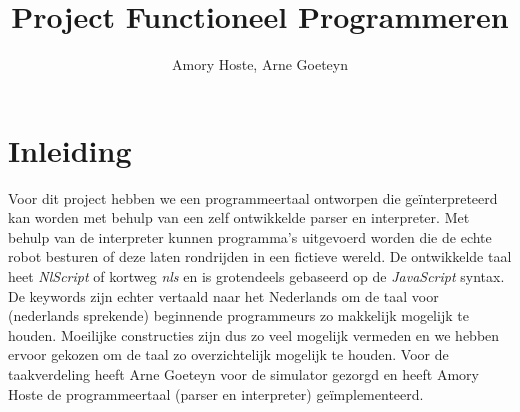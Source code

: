 \documentclass[12pt, titlepage]{article}
\begin{document}
\title{Project Functioneel Programmeren}
\author{Amory Hoste, Arne Goeteyn}
\date{}
\maketitle

\tableofcontents

\newpage
\section{Inleiding}
\label{sec:inleiding}
Voor dit project hebben we een programmeertaal ontworpen die geïnterpreteerd kan worden met behulp van een zelf ontwikkelde parser en interpreter. Met behulp van de interpreter kunnen programma's uitgevoerd worden die de echte robot besturen of deze laten rondrijden in een fictieve wereld. De ontwikkelde taal heet \emph{NlScript} of kortweg \emph{nls} en is grotendeels gebaseerd op de \emph{JavaScript} syntax. De keywords zijn echter vertaald naar het Nederlands om de taal voor (nederlands sprekende) beginnende programmeurs zo makkelijk mogelijk te houden. Moeilijke constructies zijn dus zo veel mogelijk vermeden en we hebben ervoor gekozen om de taal zo overzichtelijk mogelijk te houden. Voor de taakverdeling heeft Arne Goeteyn voor de simulator gezorgd en heeft Amory Hoste de programmeertaal (parser en interpreter) geïmplementeerd.

\newpage
\end{document}

